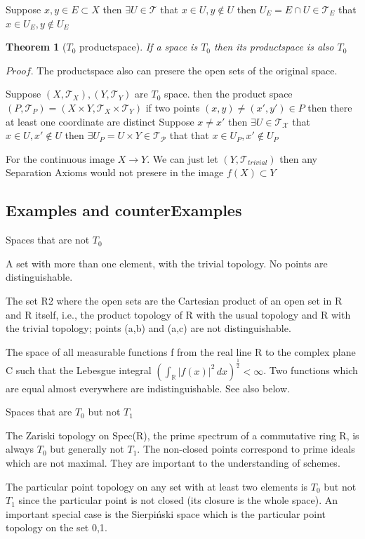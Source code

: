 \documentclass{article}
\newtheorem{theorem}{Theorem}[section]          %
\begin{document}
Suppose $x,y\in E\subset X$ then
$\exists U\in \mathcal{T}$
that $x\in U, y \not\in U$
then $U_E = E \cap U \in \mathcal{T}_E$
that $x\in U_E, y \not\in U_E$

\begin{theorem}[$T_0$ productspace]
    If a space is $T_0$ then its productspace is
    also $T_0$
\end{theorem}
$Proof.$ The productspace also can
presere the open sets
of the original space.

Suppose $(X,\mathcal{T}_X),(Y,\mathcal{T}_Y)$ are
$T_0$ space.
then the product space
$(P,\mathcal{T}_P)
    =
    (X\times Y, \mathcal{T}_X\times\mathcal{T}_Y)$
if two points
$(x,y)\not=(x',y')\in P$
then there at least one coordinate are distinct
Suppose $x\not=x'$ then
$\exists U\in \mathcal{T_X}$
that $x\in U, x' \not\in U$
then
$\exists U_P=U\times Y\in \mathcal{T_P}$
that
that $x\in U_P, x' \not\in U_P$

For the continuous image $X\to Y$.
We can just let $(Y,\mathcal{T}_{trivial})$
then any Separation Axioms would not presere
in the image $f(X)\subset Y$

\subsection{Examples and counterExamples}
Spaces that are not $T_0$

A set with more than one element, with the trivial topology. No points are distinguishable.

The set R2 where the open sets are the Cartesian product of an open set in R and R itself, i.e., the product topology of R with the usual topology and R with the trivial topology; points (a,b) and (a,c) are not distinguishable.

The space of all measurable functions f from the real line R to the complex plane C such that the Lebesgue integral
${\displaystyle \left(\int _{\mathbb {R} }|f(x)|^{2}\,dx\right)^{\frac {1}{2}}<\infty }$. Two functions which are equal almost everywhere are indistinguishable. See also below.

Spaces that are $T_0$ but not $T_1$

The Zariski topology on Spec(R), the prime spectrum of a commutative ring R, is always $T_0$ but generally not $T_1$. The non-closed points correspond to prime ideals which are not maximal. They are important to the understanding of schemes.

The particular point topology on any set with at least two elements is $T_0$ but not $T_1$ since the particular point is not closed (its closure is the whole space). An important special case is the Sierpiński space which is the particular point topology on the set {0,1}.
\end{document}
